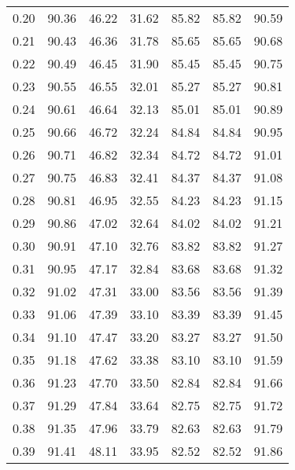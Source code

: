 \begin{tabular}{|c|c|c|c|c|c|c|}
      0.20 &     90.36 &     46.22 &      31.62 &   85.82 &      85.82 &         90.59 \\
      0.21 &     90.43 &     46.36 &      31.78 &   85.65 &      85.65 &         90.68 \\
      0.22 &     90.49 &     46.45 &      31.90 &   85.45 &      85.45 &         90.75 \\
      0.23 &     90.55 &     46.55 &      32.01 &   85.27 &      85.27 &         90.81 \\
      0.24 &     90.61 &     46.64 &      32.13 &   85.01 &      85.01 &         90.89 \\
      0.25 &     90.66 &     46.72 &      32.24 &   84.84 &      84.84 &         90.95 \\
      0.26 &     90.71 &     46.82 &      32.34 &   84.72 &      84.72 &         91.01 \\
      0.27 &     90.75 &     46.83 &      32.41 &   84.37 &      84.37 &         91.08 \\
      0.28 &     90.81 &     46.95 &      32.55 &   84.23 &      84.23 &         91.15 \\
      0.29 &     90.86 &     47.02 &      32.64 &   84.02 &      84.02 &         91.21 \\
      0.30 &     90.91 &     47.10 &      32.76 &   83.82 &      83.82 &         91.27 \\
      0.31 &     90.95 &     47.17 &      32.84 &   83.68 &      83.68 &         91.32 \\
      0.32 &     91.02 &     47.31 &      33.00 &   83.56 &      83.56 &         91.39 \\
      0.33 &     91.06 &     47.39 &      33.10 &   83.39 &      83.39 &         91.45 \\
      0.34 &     91.10 &     47.47 &      33.20 &   83.27 &      83.27 &         91.50 \\
      0.35 &     91.18 &     47.62 &      33.38 &   83.10 &      83.10 &         91.59 \\
      0.36 &     91.23 &     47.70 &      33.50 &   82.84 &      82.84 &         91.66 \\
      0.37 &     91.29 &     47.84 &      33.64 &   82.75 &      82.75 &         91.72 \\
      0.38 &     91.35 &     47.96 &      33.79 &   82.63 &      82.63 &         91.79 \\
      0.39 &     91.41 &     48.11 &      33.95 &   82.52 &      82.52 &         91.86 \\

\end{tabular}
